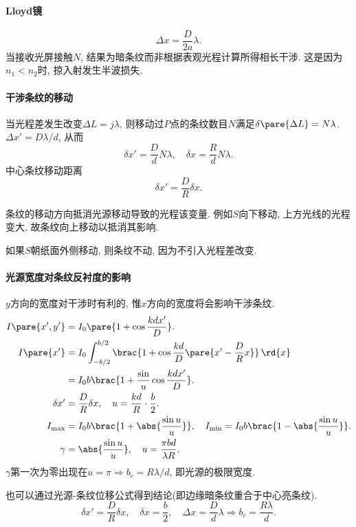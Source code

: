 \documentclass{ctexart}
\begin{document}

\paragraph{Lloyd镜} %
\label{par:lloyd镜}

\[ \Delta x = \frac{D}{2a}\lambda. \]
当接收光屏接触$N$, 结果为暗条纹而非根据表观光程计算所得相长干涉. 这是因为$n_1<n_2$时, 掠入射发生半波损失.


\paragraph{干涉条纹的移动} %
\label{par:干涉条纹的移动}

当光程差发生改变$\Delta L = j\lambda$, 则移动过$P$点的条纹数目$N$满足$\delta \pare{\Delta L} = N\lambda$. $\Delta x' = D\lambda / d$, 从而
\[ \delta x' = \frac{D}{d} N\lambda,\quad \delta x = \frac{R}{d}N\lambda. \]
中心条纹移动距离
\[ \delta x' = \frac{D}{R}\delta x. \]
\begin{remark}
    条纹的移动方向抵消光源移动导致的光程该变量. 例如$S$向下移动, 上方光线的光程变大, 故条纹向上移动以抵消其影响.
\end{remark}
\begin{remark}
    如果$S$朝纸面外侧移动, 则条纹不动, 因为不引入光程差改变.
\end{remark}


\paragraph{光源宽度对条纹反衬度的影响} %
\label{par:光源宽度对条纹反衬度的影响}

$y$方向的宽度对干涉时有利的, 惟$x$方向的宽度将会影响干涉条纹.
\begin{align*}
    I\pare{x',y'} &= I_0\pare{1+\cos \frac{kdx'}{D}}. \\
    I\pare{x'} &= I_0 \int_{-b/2}^{b/2} \brac{1+\cos \frac{kd}{D}\pare{x' - \frac{D}{R}x}}\,\rd{x} \\
    &= I_0 b \brac{1+\frac{\sin}{u}\cos \frac{kdx'}{D}}. \\
    \delta x' &= \frac{D}{R}\delta x,\quad u = \frac{kd}{R}\cdot \frac{b}{2}. \\
    I_{\mathrm{max}} &= I_0 b \brac{1+\abs{\frac{\sin u}{u}}} ,\quad I_{\mathrm{min}} = I_0 b\brac{1-\abs{\frac{\sin u}{u}}}. \\
    \gamma &= \abs{\frac{\sin u}{u}}, \quad u = \frac{\pi bd}{\lambda R}.
\end{align*}
$\gamma$第一次为零出现在$u=\pi\Rightarrow b_c = R\lambda /d$, 即光源的极限宽度.
\par
也可以通过光源-条纹位移公式得到结论(即边缘暗条纹重合于中心亮条纹).
\[ \delta x' = \frac{D}{R}\delta x,\quad \delta x= \frac{b}{2},\quad \Delta x = \frac{D}{d}\lambda \Rightarrow b_c = \frac{R\lambda}{d}. \]
\end{document}
